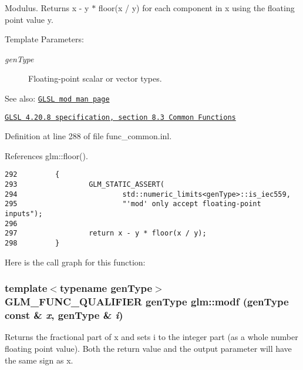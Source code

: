 Modulus. Returns x - y $\ast$ floor(x / y) for each component in x using the floating point value y.

\begin{Desc}
\item[Template Parameters:]
\begin{description}
\item[{\em genType}]Floating-point scalar or vector types.\end{description}
\end{Desc}
\begin{Desc}
\item[See also:]\href{http://www.opengl.org/sdk/docs/manglsl/xhtml/mod.xml}{\tt GLSL mod man page} 

\href{http://www.opengl.org/registry/doc/GLSLangSpec.4.20.8.pdf}{\tt GLSL 4.20.8 specification, section 8.3 Common Functions} \end{Desc}


Definition at line 288 of file func\_\-common.inl.

References glm::floor().

\begin{Code}\begin{verbatim}292         {
293                 GLM_STATIC_ASSERT(
294                         std::numeric_limits<genType>::is_iec559,
295                         "'mod' only accept floating-point inputs");
296 
297                 return x - y * floor(x / y);
298         }
\end{verbatim}
\end{Code}




Here is the call graph for this function:\hypertarget{group__core__func__common_gcc8db4cd1d86780898c8b12e465eecf4}{
\subsubsection[modf]{\setlength{\rightskip}{0pt plus 5cm}template$<$typename genType$>$ GLM\_\-FUNC\_\-QUALIFIER genType glm::modf (genType const \& {\em x}, \/  genType \& {\em i})}}
\label{group__core__func__common_gcc8db4cd1d86780898c8b12e465eecf4}


Returns the fractional part of x and sets i to the integer part (as a whole number floating point value). Both the return value and the output parameter will have the same sign as x.

